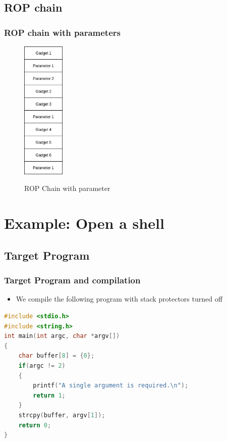 \documentclass[11pt]{beamer}
\begin{document}
\subsection{ROP chain}
\begin{frame}
    \frametitle{ROP chain with parameters}
    \begin{figure}[h]
        \caption{ROP Chain with parameter}
        \centering
        \includegraphics[width=0.18\textwidth]{gadgetstack.png}\label{gadget2}
    \end{figure}
\end{frame}

\section{Example: Open a shell}
\subsection{Target Program}
\begin{frame}[fragile]
    \frametitle{Target Program and compilation}
    \begin{itemize}
        \item We compile the following program with stack protectors turned off
    \end{itemize}
    \begin{lstlisting}[style=code, language=c]
#include <stdio.h>
#include <string.h>
int main(int argc, char *argv[])
{
    char buffer[8] = {0};
    if(argc != 2)
    {
        printf("A single argument is required.\n");
        return 1;
    }
    strcpy(buffer, argv[1]);
    return 0;
}
    \end{lstlisting}
\end{frame}
\end{document}
